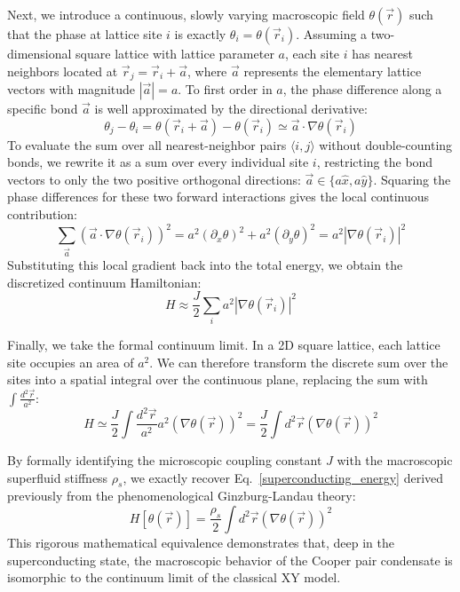 \documentclass[english,binding=0.6cm,noexaminfo]{sapthesis}
\newcommand{\rhos}{\rho_s}
\begin{document}
Next, we introduce a continuous, slowly varying macroscopic field $\theta(\vec{r})$ such that the phase at lattice site $i$ is exactly $\theta_i = \theta(\vec{r}_i)$. Assuming a two-dimensional square lattice with lattice parameter $a$, each site $i$ has nearest neighbors located at $\vec{r}_j = \vec{r}_i + \vec{a}$, where $\vec{a}$ represents the elementary lattice vectors with magnitude $|\vec{a}| = a$. To first order in $a$, the phase difference along a specific bond $\vec{a}$ is well approximated by the directional derivative:
\begin{equation}
    \theta_j - \theta_i = \theta(\vec{r}_i + \vec{a}) - \theta(\vec{r}_i) \simeq \vec{a} \cdot \nabla\theta(\vec{r}_i)
\end{equation}
To evaluate the sum over all nearest-neighbor pairs $\langle i,j \rangle$ without double-counting bonds, we rewrite it as a sum over every individual site $i$, restricting the bond vectors to only the two positive orthogonal directions: $\vec{a} \in \{a\hat{x}, a\hat{y}\}$. Squaring the phase differences for these two forward interactions gives the local continuous contribution:
\begin{equation}
    \sum_{\vec{a}} (\vec{a} \cdot \nabla\theta(\vec{r}_i))^2 = a^2(\partial_x\theta)^2 + a^2(\partial_y\theta)^2 = a^2|\nabla\theta(\vec{r}_i)|^2
\end{equation}
Substituting this local gradient back into the total energy, we obtain the discretized continuum Hamiltonian:
\begin{equation}
    H \approx \frac{J}{2} \sum_{i} a^2 |\nabla\theta(\vec{r}_i)|^2
\end{equation}

Finally, we take the formal continuum limit. In a 2D square lattice, each lattice site occupies an area of $a^2$. We can therefore transform the discrete sum over the sites into a spatial integral over the continuous plane, replacing the sum with $\int \frac{d^2\vec{r}}{a^2}$:
\begin{equation}
    H \simeq \frac{J}{2} \int \frac{d^2\vec{r}}{a^2} a^2 (\nabla\theta(\vec{r}))^2 = \frac{J}{2} \int d^2\vec{r} (\nabla\theta(\vec{r}))^2
\end{equation}

By formally identifying the microscopic coupling constant $J$ with the macroscopic superfluid stiffness $\rhos$, we exactly recover Eq.~\eqref{superconducting_energy} derived previously from the phenomenological Ginzburg-Landau theory:
\begin{equation}
    H[\theta(\vec{r})] = \frac{\rhos}{2} \int d^2\vec{r} (\nabla\theta(\vec{r}))^2
\end{equation}
This rigorous mathematical equivalence demonstrates that, deep in the superconducting state, the macroscopic behavior of the Cooper pair condensate is isomorphic to the continuum limit of the classical XY model.
\end{document}
